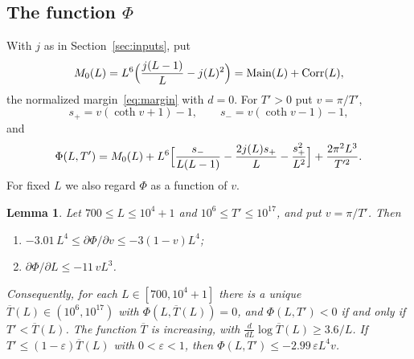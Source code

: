 \documentclass{amsart}
\newtheorem{lemma}[theorem]{Lemma}
\theoremstyle{definition}
\theoremstyle{remark}
\theoremstyle{plain}
\numberwithin{equation}{section}
\newcommand{\eps}{\varepsilon}
\newcommand{\Main}{\mathrm{Main}}
\newcommand{\Corr}{\mathrm{Corr}}
\newcommand{\Tb}{\overline{T}}
\begin{document}
\subsection{\texorpdfstring{The function $\Phi$}{The function Phi}}
With $j$ as in Section~\ref{sec:inputs}, put
\[
M_0(L)=L^6\Bigl(\frac{j(L-1)}{L}-j(L)^2\Bigr)=\Main(L)+\Corr(L),
\]
the normalized margin~\eqref{eq:margin} with $d=0$. For $T'>0$ put $v=\pi/T'$,
\[
s_+=v(\coth v+1)-1,\qquad s_-=v(\coth v-1)-1,
\]
and
\[
\Phi(L,T')=M_0(L)+L^6\Bigl[\frac{s_-}{L(L-1)}-\frac{2j(L)s_+}{L}-\frac{s_+^2}{L^2}\Bigr]+\frac{2\pi^2L^3}{T'^2}.
\]
For fixed $L$ we also regard $\Phi$ as a function of $v$.

\begin{lemma}\label{lem:Phi}
Let $700\le L\le10^4+1$ and $10^6\le T'\le10^{17}$, and put $v=\pi/T'$. Then
\begin{enumerate}
\item[(a)] $-3.01\,L^4\le\partial\Phi/\partial v\le-3(1-v)L^4$;
\item[(b)] $\partial\Phi/\partial L\le-11\,vL^3$.
\end{enumerate}
Consequently, for each $L\in[700,10^4+1]$ there is a unique $\Tb(L)\in(10^6,10^{17})$ with $\Phi(L,\Tb(L))=0$, and $\Phi(L,T')<0$ if and only if $T'<\Tb(L)$. The function $\Tb$ is increasing, with $\frac{d}{dL}\log\Tb(L)\ge3.6/L$. If $T'\le(1-\eps)\Tb(L)$ with $0<\eps<1$, then $\Phi(L,T')\le-2.99\,\eps L^4v$.
\end{lemma}
\end{document}
